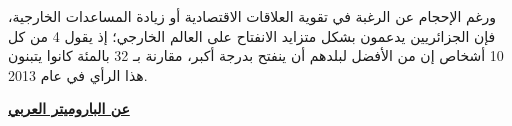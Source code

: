 \documentclass{article}
\begin{document}
 ورغم الإحجام عن الرغبة في تقوية العلاقات الاقتصادية أو زيادة المساعدات الخارجية، فإن الجزائريين يدعمون بشكل متزايد الانفتاح على العالم الخارجي؛ إذ يقول 4 من كل 10 أشخاص إن من الأفضل لبلدهم أن ينفتح بدرجة أكبر، مقارنة بـ 32 بالمئة كانوا يتبنون هذا الرأي في عام 2013.

\newpage
\pagestyle{empty}
\pagestyle{empty} 
\vspace*{1in}
\centering
\textbf {\LARGE \color{white} 	\href{http://www.arabbarometer.org/about}{عن الباروميتر العربي}} 
\vspace*{0.2in}
\end{document}
